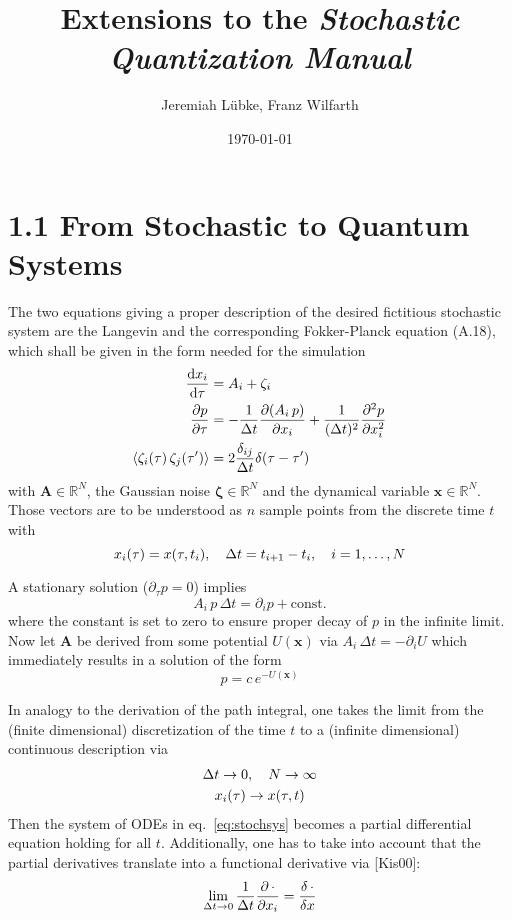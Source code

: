 \documentclass[11pt,a4paper]{scrartcl}
\title{Extensions to the \emph{Stochastic Quantization Manual}}
\author{Jeremiah Lübke, Franz Wilfarth}
\date{\today}
\newcommand{\deltaij}{\ensuremath{\delta_{ij}}}
\newcommand{\OverDeltaT}[1]{\ensuremath{\frac{#1}{\Delta t}}}
\newcommand{\nReals}{\ensuremath{\mathbb{R}^N}}
\begin{document}
\maketitle

\section*{1.1 From Stochastic to Quantum Systems}
The two equations giving a proper description of the desired fictitious
stochastic system are the Langevin and the corresponding Fokker-Planck equation
(A.18), which shall be given in the form needed for the
simulation
\begin{subequations}
\begin{align}
    \dv{x_i}{\tau}&=A_i+\zeta_i \\
    \pdv{p}{\tau}&=-\OverDeltaT{1}\pdv{(A_i\,p)}{x_i}+\frac{1}{(\Delta{t})^2}\pdv[2]{p}{x_i}
    \\
    \langle\zeta_i(\tau)\,\zeta_j(\tau')\rangle&=2\OverDeltaT{\deltaij}\delta(\tau-\tau')
\end{align}
\label{eq:stochsys}
\end{subequations}
with $\mathbf{A}\in\nReals$, the Gaussian noise $\mathbf{\zeta}\in\nReals$ and
the dynamical variable $\mathbf{x}\in\nReals$.
Those vectors are to be understood as $n$ sample points from the discrete time
$t$ with
\begin{equation*}
    x_i(\tau)=x(\tau,t_i)\qc\Delta{t}=t_{i+1}-t_i\qc i=1,\dotsc,N
\end{equation*}

A stationary solution ($\partial_{\tau}p=0$) implies
\begin{equation}
    A_i\,p\,\Delta{t}=\partial_i{p}+\mathrm{const.}
    \label{eq:stationaryp}
\end{equation}
where the constant is set to zero to ensure proper decay of $p$ in the infinite
limit. Now let $\mathbf{A}$ be derived from some potential $U(\mathbf{x})$ via
$A_i\,\Delta{t}=-\partial_i{U}$ which immediately results in a solution of
the form
\begin{equation}
    p=c\,e^{-U(\mathbf{x})}
\end{equation}

In analogy to the derivation of the path integral, one takes the limit from the
(finite dimensional) discretization of the time $t$ to a (infinite dimensional)
continuous description via
\begin{gather*}
    \Delta{t}\to0\qc N\to\infty \\
    x_i(\tau)\to x(\tau,t)
\end{gather*}
Then the system of ODEs in eq.~\eqref{eq:stochsys} becomes a partial differential
equation holding for all $t$. Additionally, one has to take into account that
the partial derivatives translate into a functional derivative via [Kis00]:
\begin{equation}
    \lim_{\Delta{t}\to0}\OverDeltaT{1}\pdv{\,\cdot}{x_i}=\fdv{\,\cdot}{x}
    \label{eq:DiscreteFunctionalDerivative}
\end{equation}
\end{document}
